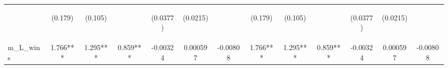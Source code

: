 \documentclass[]{article}
\begin{document}
\begin{center}
\begin{tabular}{lcccccccccccc}
\vspace{4pt} & \begin{footnotesize}(0.179)\end{footnotesize} & \begin{footnotesize}(0.105)\end{footnotesize} & \begin{footnotesize}\end{footnotesize} & \begin{footnotesize}(0.0377)\end{footnotesize} & \begin{footnotesize}(0.0215)\end{footnotesize} & \begin{footnotesize}\end{footnotesize} & \begin{footnotesize}(0.179)\end{footnotesize} & \begin{footnotesize}(0.105)\end{footnotesize} & \begin{footnotesize}\end{footnotesize} & \begin{footnotesize}(0.0377)\end{footnotesize} & \begin{footnotesize}(0.0215)\end{footnotesize} & \begin{footnotesize}\end{footnotesize} \\
m\_L\_wins & 1.766*** & 1.295*** & 0.859*** & -0.00324 & 0.000597 & -0.00808 & 1.766*** & 1.295*** & 0.859*** & -0.00324 & 0.000597 & -0.00808 \\

\end{tabular}
\end{center}
\end{document}

